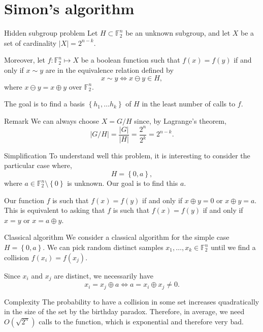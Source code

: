\documentclass[a4paper]{article}
\begin{document}
\section{Simon's algorithm}


\begin{parag}{Hidden subgroup problem}
    Let $H \subset \mathbb{F}_2^n$ be an unknown subgroup, and let $X$ be a set of cardinality $\left|X\right| = 2^{n-k}$.

    Moreover, let $f: \mathbb{F}_2^n \mapsto X$ be a boolean function such that $f\left(x\right) = f\left(y\right)$ if and only if $x \sim y$ are in the equivalence relation defined by
    \[x \sim y \iff x \ominus y \in H,\]
    where $x \ominus y = x \oplus y$ over $\mathbb{F}_2^n$.

    The goal is to find a basis $\left\{h_1, \ldots h_k\right\}$ of $H$ in the least number of calls to $f$.

    \begin{subparag}{Remark}
        We can always choose $X = G / H$ since, by Lagrange's theorem,
        \[\left|G / H\right| = \frac{\left|G\right|}{\left|H\right|} = \frac{2^n}{2^k} = 2^{n-k}.\]
    \end{subparag}

    \begin{subparag}{Simplification}
        To understand well this problem, it is interesting to consider the particular case where,
        \[H = \left\{0, a\right\},\]
        where $a \in \mathbb{F}_2^n \setminus \left\{0\right\}$ is unknown. Our goal is to find this $a$.

        Our function $f$ is such that $f\left(x\right) = f\left(y\right)$ if and only if $x \oplus y = 0$ or $x \oplus y = a$. This is equivalent to asking that $f$ is such that $f\left(x\right) = f\left(y\right)$ if and only if $x = y$ or $x = a \oplus y$. 
    \end{subparag}
\end{parag}

\begin{parag}{Classical algorithm}
    We consider a classical algorithm for the simple case $H = \left\{0, a\right\}$. We can pick random distinct samples $x_1, \ldots, x_k \in \mathbb{F}_2^n$ until we find a collision $f\left(x_i\right) = f\left(x_j\right)$. 

    Since $x_i$ and $x_j$ are distinct, we necessarily have
    \[x_i = x_j \oplus a \iff a = x_i \oplus x_j \neq 0.\]

    \begin{subparag}{Complexity}
        The probability to have a collision in some set increases quadratically in the size of the set by the birthday paradox. Therefore, in average, we need $O\left(\sqrt{2^n}\right)$ calls to the function, which is exponential and therefore very bad.
    \end{subparag}
\end{parag}
\end{document}
